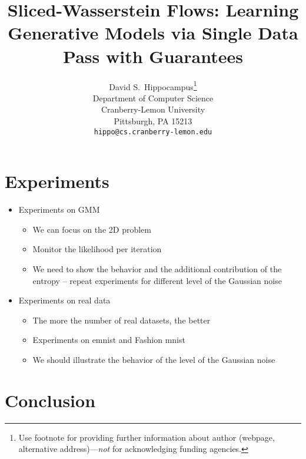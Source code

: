 \documentclass{article}
\title{Sliced-Wasserstein Flows: Learning Generative Models via Single Data Pass with Guarantees}
\author{
  David S.~Hippocampus\thanks{Use footnote for providing further
    information about author (webpage, alternative
    address)---\emph{not} for acknowledging funding agencies.} \\
  Department of Computer Science\\
  Cranberry-Lemon University\\
  Pittsburgh, PA 15213 \\
  \texttt{hippo@cs.cranberry-lemon.edu} \\
}
\begin{document}

\maketitle

\begin{abstract}

\end{abstract}











\section{Experiments}

\begin{itemize}
\item Experiments on GMM
\begin{itemize}
\item We can focus on the 2D problem
\item Monitor the likelihood per iteration
\item We need to show the behavior and the additional contribution of the entropy -- repeat experiments for different level of the Gaussian noise
\end{itemize}
\item Experiments on real data
\begin{itemize}
\item The more the number of real datasets, the better
\item Experiments on emnist and Fashion mnist
\item We should illustrate the behavior of the level of the Gaussian noise
\end{itemize}
\end{itemize}

\section{Conclusion}





\end{document}
